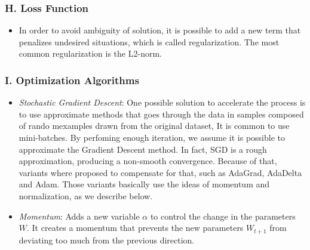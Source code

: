 \documentclass{report}
\begin{document}
\subsubsection*{H. Loss Function}
\begin{itemize}
    \item In order to avoid ambiguity of solution, it is possible to add a new term that penalizes undesired situations, which is called regularization. The most common regularization is the L2-norm.
\end{itemize}
\subsubsection*{I. Optimization Algorithms}
\begin{itemize}
    \item \textit{Stochastic Gradient Descent}: One possible solution to accelerate the process is to use approximate methods that goes through the data in samples composed of rando mexamples drawn from the original dataset, It is common to use mini-batches. By perfoming enough iteration, we assume it is possible to approximate the Gradient Descent method. In fact, SGD is a rough approximation, producing a non-smooth convergence. Because of that, variants where proposed to compensate for that, such as AdaGrad, AdaDelta and Adam. Those variants basically use the ideas of momentum and normalization, as we describe below.
    \item \textit{Momentum}: Adds a new variable $\alpha$ to control the change in the parameters $W$. It creates a momentum that prevents the new parameters $W_{t + 1}$ from deviating too much from the previous direction.
\end{itemize}
\end{document}
